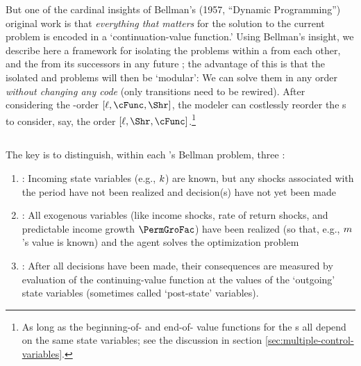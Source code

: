 But one of the cardinal insights of Bellman's (1957, ``Dynamic Programming'') original work is that \emph{everything that matters} for the solution to the current problem is encoded in a `continuation-value function.' %
Using Bellman's insight, we describe here a framework for isolating the {\stg} problems within a {\interval} from each other, and the {\interval} from its successors in any future {\interval}; the advantage of this is that the isolated {\stg} and {\interval} problems will then be `modular': We can solve them in any order \textit{without changing any code} (only transitions need to be rewired). After considering the {\stg}-order $[\ell,\cFunc,\Shr]$, the modeler can costlessly reorder the {\stg}s to consider, say, the order $[\ell,\Shr,\cFunc]$.\footnote{As long as the beginning-of-{\stg} and end-of-{\stg} value functions for the {\stg}s all depend on the same state variables; see the discussion in section \ref{sec:multiple-control-variables}.}

\subsection{\Moves}

The key is to distinguish, within each {\stg}'s Bellman problem, three {\moves}:

\begin{enumerate}
\item \textbf{\Arrival}: Incoming state variables (e.g., $k$) are known, but any shocks associated with the period have not been realized and decision(s) have not yet been made
\item \textbf{\Decision}: All exogenous variables (like income shocks, rate of return shocks, and predictable income growth $\PermGroFac$) have been realized (so that, e.g., $m$'s value is known) and the agent solves the optimization problem
\item \textbf{\Continuation}: After all decisions have been made, their consequences are measured by evaluation of the continuing-value function at the values of the `outgoing' state variables (sometimes called `post-state' variables).
\end{enumerate}

